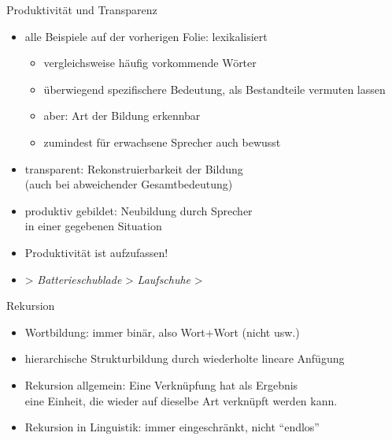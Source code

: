 \begin{frame}
  {Produktivität und Transparenz}
  \onslide<+->
  \begin{itemize}[<+->]
    \item \alert{alle} Beispiele auf der vorherigen Folie: \alert{lexikalisiert}
      \begin{itemize}[<+->]
        \item vergleichsweise häufig vorkommende Wörter
        \item überwiegend spezifischere Bedeutung, als Bestandteile vermuten lassen
        \item aber: Art der Bildung erkennbar
        \item zumindest für erwachsene Sprecher auch bewusst
      \end{itemize}
      \Halbzeile
    \item \alert{transparent}: Rekonstruierbarkeit der Bildung\\
      (auch bei abweichender Gesamtbedeutung)
      \Halbzeile
    \item \alert{produktiv gebildet}: Neubildung durch Sprecher\\
      in einer gegebenen Situation
    \item Produktivität ist  aufzufassen!
    \item {} > \textit{Batterieschublade} > \textit{Laufschuhe} > 
  \end{itemize}
\end{frame}

\begin{frame}[fragile,label=hierarchie]
  {Rekursion}
  \onslide<+->
  \onslide<+->
  \begin{center}
    \scalebox{0.7}{
      \begin{forest}
        [Bushaltestellenunterstandsreparatur
          [Bushaltestellenunterstand
            [Bushaltestelle
              [Bus]
              [Haltestelle
                [halten]
                [Stelle]
              ]
            ]
            [Unterstand
              [unter]
              [Stand]
            ]
          ]
          [Reparatur]
        ]
      \end{forest}
    }
  \end{center}
  \begin{itemize}[<+->]
    \item Wortbildung: immer \alert{binär}, also \alert{Wort+Wort} (nicht  usw.)
      \Viertelzeile
    \item \alert{hierarchische Strukturbildung} durch wiederholte lineare Anfügung
      \Viertelzeile
    \item Rekursion allgemein: \alert{Eine Verknüpfung hat als Ergebnis\\
      eine Einheit, die wieder auf dieselbe Art verknüpft werden kann.}
    \item Rekursion in Linguistik: immer eingeschränkt, nicht "`endlos"'
  \end{itemize}
\end{frame}

